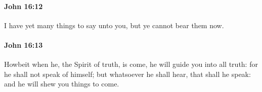 		\paragraph{John 16:12} %
			\label{JOHN-16-12}

			I have yet many things to say unto you, but ye cannot bear them now.

			\begin{framed}
				\scriptsize
				\begin{compactdesc}
					\item[SBLG] 
				\end{compactdesc}
			\end{framed}

		\paragraph{John 16:13} %
			\label{JOHN-16-13}

			Howbeit when he, the Spirit of truth, is come, he will guide you into all truth: for he shall not speak of himself; but whatsoever he shall hear, that shall he speak: and he will shew you things to come.

